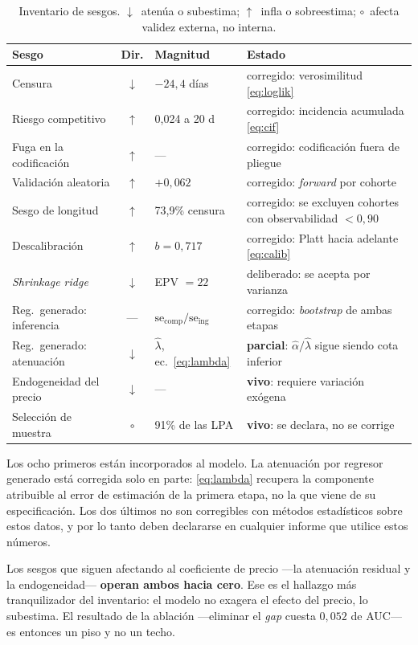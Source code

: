 \documentclass[11pt,a4paper]{article}
\newcommand{\dn}{\textcolor{sesgoAbajo}{$\downarrow$}}
\newcommand{\up}{\textcolor{sesgoArriba}{$\uparrow$}}
\newcommand{\nt}{\textcolor{neutro}{$\circ$}}
\theoremstyle{definition}
\begin{document}
\begin{table}[h]
\centering
\small
\begin{tabular}{@{}p{4.6cm}cp{2.4cm}p{5.4cm}@{}}
\toprule
Sesgo & Dir. & Magnitud & Estado \\
\midrule
Censura & \dn & $-24{,}4$ días & corregido: verosimilitud \eqref{eq:loglik} \\
Riesgo competitivo & \up & 0,024 a 20 d & corregido: incidencia acumulada \eqref{eq:cif} \\
Fuga en la codificación & \up & --- & corregido: codificación fuera de pliegue \\
Validación aleatoria & \up & $+0{,}062$ & corregido: \emph{forward} por cohorte \\
Sesgo de longitud & \up & 73,9\% censura & corregido: se excluyen cohortes con observabilidad $<0{,}90$ \\
Descalibración & \up & $b=0{,}717$ & corregido: Platt hacia adelante \eqref{eq:calib} \\
\emph{Shrinkage ridge} & \dn & EPV $=22$ & deliberado: se acepta por varianza \\
\addlinespace
Reg.\ generado: inferencia & --- & $\mathrm{se}_{\text{comp}}/\mathrm{se}_{\text{ing}}$ & corregido: \emph{bootstrap} de ambas etapas \\
Reg.\ generado: atenuación & \dn & $\hat{\lambda}$, ec.\ \eqref{eq:lambda} & \textbf{parcial}: $\hat{\alpha}/\hat{\lambda}$ sigue siendo cota inferior \\
Endogeneidad del precio & \dn & --- & \textbf{vivo}: requiere variación exógena \\
Selección de muestra & \nt & 91\% de las LPA & \textbf{vivo}: se declara, no se corrige \\
\bottomrule
\end{tabular}
\caption{Inventario de sesgos. \dn\ atenúa o subestima; \up\ infla o sobreestima;
\nt\ afecta validez externa, no interna.}
\end{table}

Los ocho primeros están incorporados al modelo. La atenuación por regresor
generado está corregida solo en parte: \eqref{eq:lambda} recupera la componente
atribuible al error de estimación de la primera etapa, no la que viene de su
especificación. Los dos últimos no son corregibles con métodos estadísticos sobre
estos datos, y por lo tanto deben declararse en cualquier informe que utilice estos
números.

Los sesgos que siguen afectando al coeficiente de precio ---la atenuación
residual y la endogeneidad--- \textbf{operan ambos hacia cero}. Ese es el hallazgo más tranquilizador del inventario: el modelo no
exagera el efecto del precio, lo subestima. El resultado de la ablación
---eliminar el \emph{gap} cuesta $0{,}052$ de AUC--- es entonces un piso y no un
techo.
\end{document}
